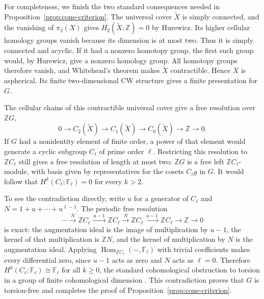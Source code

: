 For completeness, we finish the two standard consequences needed in
Proposition~\ref{prop:cone-criterion}.  The universal cover
$\widetilde X$ is simply connected, and the vanishing of $\pi_2(X)$
gives $H_2(\widetilde X;\mathbb Z)=0$ by Hurewicz.  Its higher cellular
homology groups vanish because its dimension is at most two.  Thus it
is simply connected and acyclic.  If it had a nonzero homotopy group,
the first such group would, by Hurewicz, give a nonzero homology group.
All homotopy groups therefore vanish, and Whitehead's theorem makes
$\widetilde X$ contractible.  Hence $X$ is aspherical.  Its finite
two-dimensional CW structure gives a finite presentation for $G$.

The cellular chains of this contractible universal cover give a free
resolution over $\mathbb ZG$,
\[
 0\longrightarrow C_2(\widetilde X)
 \longrightarrow C_1(\widetilde X)
 \longrightarrow C_0(\widetilde X)
 \longrightarrow\mathbb Z\longrightarrow0.
\]
If $G$ had a nonidentity element of finite order, a power of that
element would generate a cyclic subgroup $C_\ell$ of prime order
$\ell$.  Restricting this resolution to $\mathbb ZC_\ell$ still gives
a free resolution of length at most two: $\mathbb ZG$ is a free left
$\mathbb ZC_\ell$-module, with basis given by representatives for the
cosets $C_\ell g$ in $G$.  It would follow that
$H^k(C_\ell;\mathbb F_\ell)=0$ for every $k>2$.

To see the contradiction directly, write $u$ for a generator of
$C_\ell$ and $N=1+u+\cdots+u^{\ell-1}$.  The periodic free resolution
\[
 \cdots\xrightarrow{\,N\,}\mathbb ZC_\ell
 \xrightarrow{\,u-1\,}\mathbb ZC_\ell
 \xrightarrow{\,N\,}\mathbb ZC_\ell
 \xrightarrow{\,u-1\,}\mathbb ZC_\ell
 \longrightarrow\mathbb Z\longrightarrow0
\]
is exact: the augmentation ideal is the image of multiplication by
$u-1$, the kernel of that multiplication is $\mathbb ZN$, and the
kernel of multiplication by $N$ is the
augmentation ideal.  Applying
$\operatorname{Hom}_{\mathbb ZC_\ell}(-,\mathbb F_\ell)$ with trivial
coefficients makes every differential zero, since $u-1$ acts as zero
and $N$ acts as $\ell=0$.  Therefore
$H^k(C_\ell;\mathbb F_\ell)\cong\mathbb F_\ell$ for all $k\ge0$,
the standard cohomological obstruction to torsion in a group of finite
cohomological dimension \cite[Chapter VIII]{Brown1982}.  This
contradiction proves that $G$ is torsion-free and completes the proof
of Proposition~\ref{prop:cone-criterion}.

